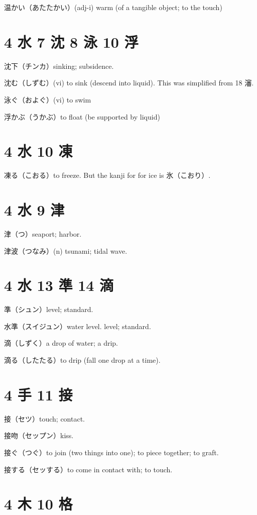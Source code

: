 温かい（あたたかい）(adj-i) warm (of a tangible object; to the touch)

\section{4 水 7 沈 8 泳 10 浮}

沈下（チンカ）sinking; subsidence.

沈む（しずむ）(vi) to sink (descend into liquid).
This was simplified from 18 瀋.

泳ぐ（およぐ）(vi) to swim

浮かぶ（うかぶ）to float (be supported by liquid)

\section{4 水 10 凍}

凍る（こおる）to freeze.
But the kanji for for ice is 氷（こおり）.

\section{4 水 9 津}

津（つ）seaport; harbor.

津波（つなみ）(n) tsunami; tidal wave.

\section{4 水 13 準 14 滴}

準（シュン）level; standard.

水準（スイジュン）water level. level; standard.

滴（しずく）a drop of water; a drip.

滴る（したたる）to drip (fall one drop at a time).

\section{4 手 11 接}

接（セツ）touch; contact.

接吻（セップン）kiss.

接ぐ（つぐ）to join (two things into one); to piece together; to graft.

接する（セッする）to come in contact with; to touch.

\section{4 木 10 格}

